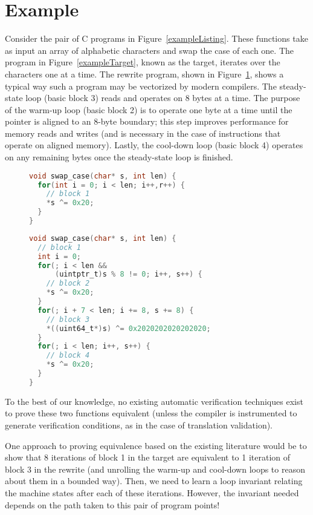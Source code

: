 \section{Example}\label{example-sec}

Consider the pair of C programs in Figure~\ref{exampleListing}. These
functions take as input an array of alphabetic characters and swap the
case of each one. The program in Figure~\ref{exampleTarget}, known as
the target, iterates over the characters one at a time. The rewrite
program, shown in Figure~\ref{exampleRewrite}, shows a typical way
such a program may be vectorized by modern compilers. The steady-state
loop (basic block 3) reads and operates on 8 bytes at a time. The
purpose of the warm-up loop (basic block 2) is to operate one byte at
a time until the pointer is aligned to an 8-byte boundary; this step
improves performance for memory reads and writes (and is necessary in
the case of instructions that operate on aligned memory). Lastly, the
cool-down loop (basic block 4) operates on any remaining bytes once
the steady-state loop is finished.

\begin{figure}\label{exampleListing}
\begin{lstlisting}[language=C]
void swap_case(char* s, int len) {
  for(int i = 0; i < len; i++,r++) {
    // block 1
    *s ^= 0x20;
  }
}
\end{lstlisting}
\label{exampleTarget}
\begin{lstlisting}[language=C]
void swap_case(char* s, int len) {
  // block 1
  int i = 0;        
  for(; i < len &&
      (uintptr_t)s % 8 != 0; i++, s++) {
    // block 2
    *s ^= 0x20;                             
  }
  for(; i + 7 < len; i += 8, s += 8) {
    // block 3
    *((uint64_t*)s) ^= 0x2020202020202020;
  }
  for(; i < len; i++, s++) {
    // block 4
    *s ^= 0x20;            
  }
}
\end{lstlisting}
\label{exampleRewrite}
\end{figure}

To the best of our knowledge, no existing automatic verification
techniques exist to prove these two functions equivalent (unless the
compiler is instrumented to generate verification conditions, as in
the case of translation validation).

One approach to proving equivalence based on the existing literature
would be to show that 8 iterations of block 1 in the target are
equivalent to 1 iteration of block 3 in the rewrite (and unrolling the
warm-up and cool-down loops to reason about them in a bounded way).
Then, we need to learn a loop invariant relating the machine states
after each of these iterations. However, the invariant needed depends
on the path taken to this pair of program points!  

